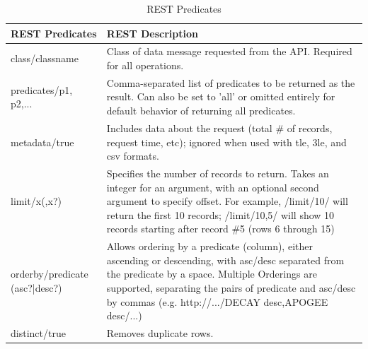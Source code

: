 \documentclass[12pt]{article}
\begin{document}
\begin{table}[H]\singlespacing
	\caption{REST Predicates\cite{SpaceTrackAPI}}
	\label{tab:restP}
	\begin{tabular}{|p{4cm}|p{11.5cm}|}
		\hline
		REST Predicates                & REST Description                                                                                                                                                                                                                                                           \\ \hline
		class/classname                & Class of data message requested from the API. Required for all operations.                                                                                                                                                                                                 \\ \hline
		predicates/p1, p2,...          & Comma-separated list of predicates to be returned as the result. Can also be set to 'all' or omitted entirely for default behavior of returning all predicates.                                                                                                            \\ \hline
		metadata/true                  & Includes data about the request (total \# of records, request time, etc); ignored when used with tle, 3le, and csv formats.                                                                                                                                                \\ \hline
		limit/x(,x?)                   & Specifies the number of records to return. Takes an integer for an argument, with an optional second argument to specify offset. For example, /limit/10/ will return the first 10 records; /limit/10,5/ will show 10 records starting after record \#5 (rows 6 through 15) \\ \hline
		orderby/predicate (asc?|desc?) & Allows ordering by a predicate (column), either ascending or descending, with asc/desc separated from the predicate by a space. Multiple Orderings are supported, separating the pairs of predicate and asc/desc by commas (e.g. http://.../DECAY desc,APOGEE desc/...)    \\ \hline
		distinct/true                  & Removes duplicate rows.                                                                                                                                                                                                                                                    \\ \hline

\end{tabular}
\end{table}
\end{document}
